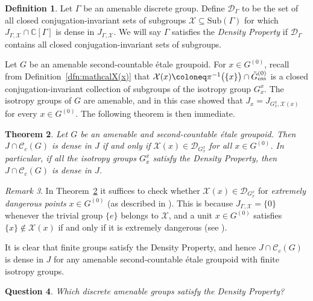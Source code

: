 \documentclass[11pt, oneside, reqno]{amsart}
\newcommand{\Gu}{G^{(0)}}
\newcommand{\cg}{\mathscr{C}_c(G)}
\newcommand{\ess}{{\rm{ess}}}
\newcommand{\tiGu}{\tilde{G}^{(0)}}
\newtheorem{thm}{Theorem}[section]
\newtheorem{question}[thm]{Question}
\theoremstyle{definition}
\newtheorem{dfn}[thm]{Definition}
\theoremstyle{remark}
\newtheorem{rmk}[thm]{Remark}
\numberwithin{equation}{section}
\begin{document}
\begin{dfn}\label{DefnPropD}
    Let $\Gamma$ be an amenable discrete group. Define $\mathcal{D}_\Gamma$ to be the set of all closed conjugation-invariant sets of subgroups $\mathcal{X} \subseteq \text{Sub}(\Gamma)$ for which $J_{\Gamma,\mathcal{X}}\cap\mathbb{C}[\Gamma]$ is dense in $J_{\Gamma,\mathcal{X}}$. We will say $\Gamma$ satisfies the \emph{Density Property} if $\mathcal{D}_\Gamma$ contains all closed conjugation-invariant sets of subgroups.
\end{dfn}

Let $G$ be an amenable second-countable \'etale groupoid. For $x\in \Gu$, recall from Definition~\ref{dfn:mathcalX(x)} that $\mathcal{X}(x) \coloneq \pi^{-1}\big(\{x\}\big)\cap\tiGu_{\ess}$ is a closed conjugation-invariant collection of subgroups of the isotropy group $G^x_x$. The isotropy groups of $G$ are amenable, and in this case \cite[Definition~5.1 \& Theorem~5.5]{Hume} showed that $J_{x} = J_{G^{x}_{x},\mathcal{X}(x)}$ for every $x \in \Gu$. The following theorem is then immediate.

\begin{thm}\label{ReductionToIso}
    Let $G$ be an amenable and second-countable \'etale groupoid. Then $J\cap\cg$ is dense in $J$ if and only if $\mathcal{X}(x) \in \mathcal{D}_{G^x_x}$ for all $x \in \Gu$. In particular, if all the isotropy groups $G^x_x$ satisfy the Density Property, then $J\cap\cg$ is dense in $J$.
\end{thm}

\begin{rmk}
    In Theorem~\ref{ReductionToIso} it suffices to check whether $\mathcal{X}(x)\in \mathcal{D}_{G^{x}_{x}}$ for \emph{extremely dangerous points} $x \in \Gu$ (as described in \cite[Proposition~1.12]{NS23}). This is because $J_{\Gamma,\mathcal{X}} = \{0\}$ whenever the trivial group $\{e\}$ belongs to $\mathcal{X}$, and a unit $x \in \Gu$ satisfies $\{x\}\notin\mathcal{X}(x)$ if and only if it is extremely dangerous (see  \cite[Corollary~5.6]{Hume}).
\end{rmk}


It is clear that finite groups satisfy the Density Property, and hence $J \cap \cg$ is dense in $J$ for any amenable second-countable \'etale groupoid with finite isotropy groups.

\begin{question}
    Which discrete amenable groups satisfy the Density Property?
\end{question}
\end{document}
